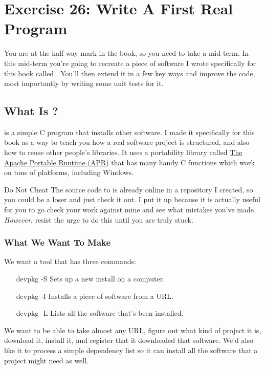 \chapter{Exercise 26: Write A First Real Program}

You are at the half-way mark in the book, so you need to take a 
mid-term.  In this mid-term you're going to recreate a piece
of software I wrote specifically for this book called .
You'll then extend it in a few key ways and improve the code, most
importantly by writing some unit tests for it.

\section{What Is ?}

 is a simple C program that installs other software.  I
made it specifically for this book as a way to teach you how a real 
software project is structured, and also how to reuse other people's
libraries.  It uses a portability library called \href{http://apr.apache.org/}{The
Apache Portable Runtime (APR)} that has many handy C functions which
work on tons of platforms, including Windows.

\begin{aside}{Do Not Cheat}
The source code to  is already online in a repository
I created, so you could be a loser and just check it out.  I put it up
because it is actually useful for you to go check your work against
mine and see what mistakes you've made.  \emph{However}, resist the
urge to do this until you are truly stuck.
\end{aside}

\subsection{What We Want To Make}

We want a tool that has three commands:

\begin{enumerate}
\item[devpkg -S] Sets up a new install on a computer.
\item[devpkg -I] Installs a piece of software from a URL.
\item[devpkg -L] Lists all the software that's been installed.
\end{enumerate}

We want  to be able to take almost any URL, figure
out what kind of project it is, download it, install it, and register
that it downloaded that software.  We'd also like it to process a
simple dependency list so it can install all the software that a
project might need as well.

